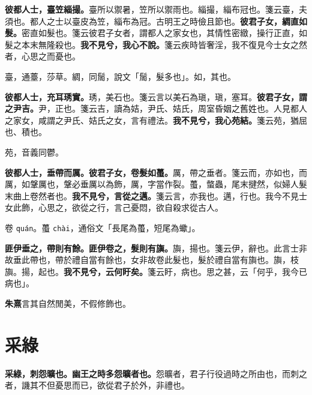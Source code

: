 \textbf{彼都人士，臺笠緇撮。}{\footnotesize 臺所以禦暑，笠所以禦雨也。緇撮，緇布冠也。箋云臺，夫須也。都人之士以臺皮為笠，緇布為冠。古明王之時儉且節也。}\textbf{彼君子女，綢直如髮。}{\footnotesize 密直如髮也。箋云彼君子女者，謂都人之家女也，其情性密緻，操行正直，如髮之本末無隆殺也。}\textbf{我不見兮，我心不說。}{\footnotesize 箋云疾時皆奢淫，我不復見今士女之然者，心思之而憂也。}

\begin{quoting}臺，通薹，莎草。綢，同䯾，說文「䯾，髮多也」。如，其也。\end{quoting}

\textbf{彼都人士，充耳琇實。}{\footnotesize 琇，美石也。箋云言以美石為瑱，瑱，塞耳。}\textbf{彼君子女，謂之尹吉。}{\footnotesize 尹，正也。箋云吉，讀為姞，尹氏、姞氏，周室昏姻之舊姓也。人見都人之家女，咸謂之尹氏、姞氏之女，言有禮法。}\textbf{我不見兮，我心苑結。}{\footnotesize 箋云苑，猶屈也、積也。}

\begin{quoting}苑，音義同鬱。\end{quoting}

\textbf{彼都人士，垂帶而厲。彼君子女，卷髮如蠆。}{\footnotesize 厲，帶之垂者。箋云而，亦如也，而厲，如鞶厲也，鞶必垂厲以為飾，厲，字當作裂。蠆，螫蟲，尾末揵然，似婦人髮末曲上卷然者也。}\textbf{我不見兮，言從之邁。}{\footnotesize 箋云言，亦我也。邁，行也。我今不見士女此飾，心思之，欲從之行，言己憂悶，欲自殺求從古人。}

\begin{quoting}卷 \texttt{quán}。蠆 \texttt{chài}，通俗文「長尾為蠆，短尾為蠍」。\end{quoting}

\textbf{匪伊垂之，帶則有餘。匪伊卷之，髮則有旟。}{\footnotesize 旟，揚也。箋云伊，辭也。此言士非故垂此帶也，帶於禮自當有餘也，女非故卷此髮也，髮於禮自當有旟也。旟，枝旟。揚，起也。}\textbf{我不見兮，云何盱矣。}{\footnotesize 箋云盱，病也。思之甚，云「何乎，我今已病也」。}

\begin{quoting}\textbf{朱熹}言其自然閒美，不假修飾也。\end{quoting}

\section{采綠}


\textbf{采綠，刺怨曠也。幽王之時多怨曠者也。}{\footnotesize 怨曠者，君子行役過時之所由也，而刺之者，譏其不但憂思而已，欲從君子於外，非禮也。}

